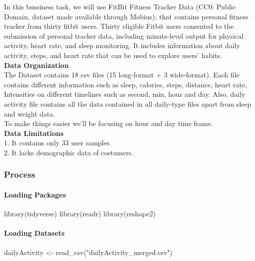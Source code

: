 \documentclass[
]{article}
\newenvironment{Shaded}{\begin{snugshade}}{\end{snugshade}}
\newcommand{\FunctionTok}[1]{\textcolor[rgb]{0.00,0.00,0.00}{#1}}
\newcommand{\NormalTok}[1]{#1}
\newcommand{\OtherTok}[1]{\textcolor[rgb]{0.56,0.35,0.01}{#1}}
\newcommand{\StringTok}[1]{\textcolor[rgb]{0.31,0.60,0.02}{#1}}
\begin{document}
In this bussiness task, we will use FitBit Fitness Tracker Data (CC0:
Public Domain, dataset made available through Mobius): that contains
personal fitness tracker from thirty fitbit users. Thirty eligible
Fitbit users consented to the submission of personal tracker data,
including minute-level output for physical activity, heart rate, and
sleep monitoring. It includes information about daily activity, steps,
and heart rate that can be used to explore users' habits.\\
\textbf{Data Organization}\\
The Dataset contains 18 csv files (15 long-format + 3 wide-format). Each
file contains different information such as sleep, calories, steps,
distance, heart rate, Intensities on different timelines such as second,
min, hour and day. Also, daily activity file contains all the data
contained in all daily-type files apart from sleep and weight data.\\
To make things easier we'll be focusing on hour and day time frame.\\
\textbf{Data Limitations}\\
1. It contains only 33 user samples.\\
2. It lacks demographic data of costumers.

\hypertarget{process}{%
\subsubsection{Process}\label{process}}

\hypertarget{loading-packages}{%
\paragraph{Loading Packages}\label{loading-packages}}

\begin{Shaded}
\begin{Highlighting}[]
\FunctionTok{library}\NormalTok{(tidyverse)}
\FunctionTok{library}\NormalTok{(readr)}
\FunctionTok{library}\NormalTok{(reshape2)}
\end{Highlighting}
\end{Shaded}

\hypertarget{loading-datasets}{%
\paragraph{Loading Datasets}\label{loading-datasets}}

\begin{Shaded}
\begin{Highlighting}[]
\NormalTok{dailyActivity }\OtherTok{\textless{}{-}} \FunctionTok{read\_csv}\NormalTok{(}\StringTok{"dailyActivity\_merged.csv"}\NormalTok{)}
\end{Highlighting}
\end{Shaded}
\end{document}
